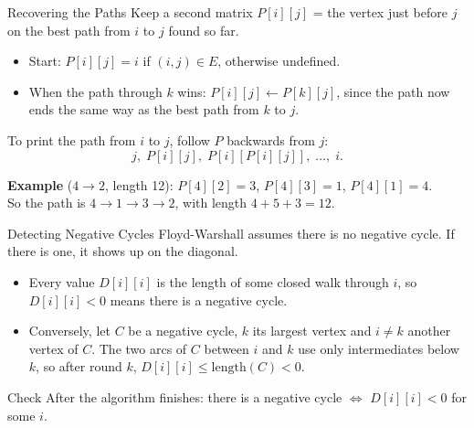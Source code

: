 \documentclass[10pt,aspectratio=169,xcolor=table]{beamer}
\begin{document}
\begin{frame}{Recovering the Paths}
  Keep a second matrix $P[i][j]$ = the vertex just \alert{before} $j$ on the
  best path from $i$ to $j$ found so far.

  \begin{itemize}
    \item Start: $P[i][j] = i$ if $(i, j) \in E$, otherwise undefined.
    \item When the path through $k$ wins: $P[i][j] \gets P[k][j]$, since the
          path now ends the same way as the best path from $k$ to $j$.
  \end{itemize}

  \pause
  \medskip
  To print the path from $i$ to $j$, follow $P$ backwards from $j$:
  \[
    j,\; P[i][j],\; P[i][P[i][j]],\; \ldots,\; i.
  \]

  \pause
  \textbf{Example} ($4 \to 2$, length 12):
  $P[4][2] = 3$, $P[4][3] = 1$, $P[4][1] = 4$. \\
  So the path is $4 \to 1 \to 3 \to 2$, with length $4 + 5 + 3 = 12$.
\end{frame}

\begin{frame}{Detecting Negative Cycles}
  Floyd-Warshall assumes there is no negative cycle. If there is one, it
  shows up on the \alert{diagonal}.

  \bigskip
  \begin{itemize}
    \item Every value $D[i][i]$ is the length of some closed walk through $i$,
          so $D[i][i] < 0$ means there is a negative cycle.
    \item Conversely, let $C$ be a negative cycle, $k$ its largest vertex and
          $i \ne k$ another vertex of $C$. The two arcs of $C$ between $i$ and
          $k$ use only intermediates below $k$, so after round $k$,
          $D[i][i] \le \text{length}(C) < 0$.
  \end{itemize}

  \begin{block}{Check}
    After the algorithm finishes: there is a negative cycle
    $\iff$ $D[i][i] < 0$ for some $i$.
  \end{block}
\end{frame}
\end{document}
